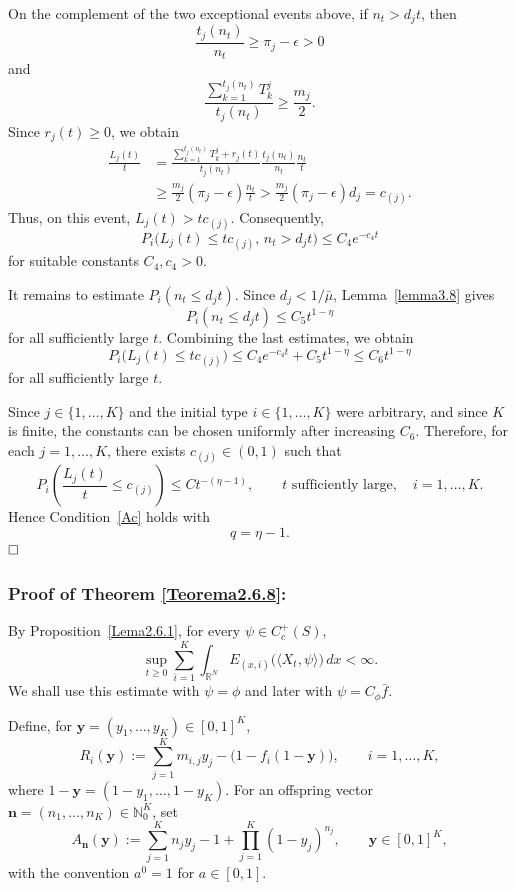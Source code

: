 \documentclass[reqno,final,11pt]{amsart}
\newcommand{\1}{\mathbbm{1}}
\theoremstyle{plain}
\theoremstyle{definition}
\theoremstyle{remark}
\begin{document}
On the complement of the two exceptional events above, if \(n_t>d_jt\), then
\[
\frac{t_j(n_t)}{n_t}\ge \pi_j-\epsilon>0
\]
and
\[
\frac{\sum_{k=1}^{t_j(n_t)}T_k^j}{t_j(n_t)}
\ge
\frac{m_j}{2}.
\]
Since \(r_j(t)\ge0\), we obtain
\[
\begin{split}
\frac{L_j(t)}{t}
&=
\frac{\sum_{k=1}^{t_j(n_t)}T_k^j+r_j(t)}{t_j(n_t)}
\frac{t_j(n_t)}{n_t}
\frac{n_t}{t}
\\
&\ge
\frac{m_j}{2}(\pi_j-\epsilon)\frac{n_t}{t}
>
\frac{m_j}{2}(\pi_j-\epsilon)d_j
=
c_{(j)}.
\end{split}
\]
Thus, on this event, \(L_j(t)>tc_{(j)}\). Consequently,
\[
P_i\big(L_j(t)\le tc_{(j)},\, n_t>d_jt\big)
\le
C_4e^{-c_4t}
\]
for suitable constants \(C_4,c_4>0\).

It remains to estimate \(P_i(n_t\le d_jt)\). Since \(d_j<1/\bar\mu\),
Lemma~\ref{lemma3.8} gives
\[
P_i(n_t\le d_jt)
\le
C_5t^{1-\eta}
\]
for all sufficiently large \(t\). Combining the last estimates, we obtain
\[
P_i\big(L_j(t)\le tc_{(j)}\big)
\le
C_4e^{-c_4t}+C_5t^{1-\eta}
\le
C_6t^{1-\eta}
\]
for all sufficiently large \(t\).

Since \(j\in\{1,\dots,K\}\) and the initial type \(i\in\{1,\dots,K\}\) were arbitrary,
and since \(K\) is finite, the constants can be chosen uniformly after increasing
\(C_6\). Therefore, for each \(j=1,\dots,K\), there exists \(c_{(j)}\in(0,1)\) such that
\[
P_i\left(
\frac{L_j(t)}{t}\le c_{(j)}
\right)
\le
C t^{-(\eta-1)},
\qquad t \text{ sufficiently large},\quad i=1,\dots,K.
\]
Hence Condition~\ref{Ac} holds with
\[
q=\eta-1.
\]
\(\hfill\square\)

\subsubsection*{Proof of Theorem \ref{Teorema2.6.8}:} By Proposition~\ref{Lema2.6.1}, for every \(\psi\in C_c^+(S)\),
\begin{equation}\label{eq:K-first-moment-bound}
\sup_{t\ge0}\sum_{i=1}^K
\int_{\mathbb R^N}
E_{(x,i)}\big(\langle X_t,\psi\rangle\big)\,dx
<\infty.
\end{equation}
We shall use this estimate with \(\psi=\phi\) and later with
\(\psi=C_\phi\bar f\).

Define, for \(\mathbf y=(y_1,\dots,y_K)\in[0,1]^K\),
\[
R_i(\mathbf y)
:=
\sum_{j=1}^K m_{i,j}y_j
-
\bigl(1-f_i(1-\mathbf y)\bigr),
\qquad i=1,\dots,K,
\]
where \(1-\mathbf y=(1-y_1,\dots,1-y_K)\). For an offspring vector
\(\mathbf n=(n_1,\dots,n_K)\in\mathbb N_0^K\), set
\[
A_{\mathbf n}(\mathbf y)
:=
\sum_{j=1}^K n_jy_j
-
1
+
\prod_{j=1}^K(1-y_j)^{n_j},
\qquad
\mathbf y\in[0,1]^K,
\]
with the convention \(a^0=1\) for \(a\in[0,1]\).
\end{document}
